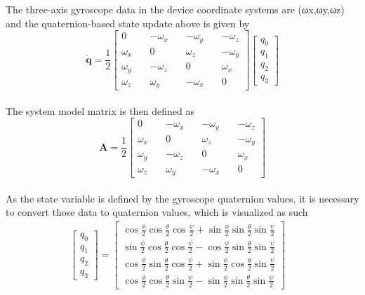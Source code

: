 \documentclass{l4proj}
\begin{document}
The three-axis gyroscope data in the device coordinate systems are (ωx,ωy,ωz) and the quaternion-based state update above is given by
\begin{equation*} \dot {\boldsymbol {q}} = \frac {1}{2}\left [{ {\begin{array}{*{20}{c}} 0&\quad { - {\omega _{x}}}&\quad { - {\omega _{y}}}&\quad { - {\omega _{z}}}\\ {\omega _{x}}&\quad 0&\quad {\omega _{z}}&\quad { - {\omega _{y}}}\\ {\omega _{y}}&\quad { - {\omega _{z}}}&\quad 0&\quad {\omega _{x}}\\ {\omega _{z}}&\quad {\omega _{y}}&\quad { - {\omega _{x}}}&\quad 0 \end{array}} }\right]\left [{ \begin{array}{l} {q_{0}}\\ {q_{1}}\\ {q_{2}}\\ {q_{3}} \end{array} }\right]\tag{10}\end{equation*}\\
The system model matrix is then defined as
\begin{equation*} \boldsymbol {A} = \frac {1}{2}\left [{ {\begin{array}{*{20}{c}} 0&\quad { - {\omega _{x}}}&\quad { - {\omega _{y}}}&\quad { - {\omega _{z}}}\\ {\omega _{x}}&\quad 0&\quad {\omega _{z}}&\quad { - {\omega _{y}}}\\ {\omega _{y}}&\quad { - {\omega _{z}}}&\quad 0&\quad {\omega _{x}}\\ {\omega _{z}}&\quad {\omega _{y}}&\quad { - {\omega _{x}}}&\quad 0 \end{array}} }\right]\tag{11}\end{equation*}\\
As the state variable is defined by the gyroscope quaternion values, it is necessary to convert those data to quaternion values, which is visualized as such
\begin{align*} \left [{ \begin{array}{l} {q_{0}}\\ {q_{1}}\\ {q_{2}}\\ {q_{3}} \end{array} }\right] = \left [{ \begin{array}{*{20}{c}} {\cos \frac {\phi }{2}\cos \frac {\theta }{2}\cos \frac {\psi }{2} + \sin \frac {\phi }{2}\sin \frac {\theta }{2}\sin \frac {\psi }{2}}\\[0.4pc] {\sin \frac {\phi }{2}\cos \frac {\theta }{2}\cos \frac {\psi }{2} - \cos \frac {\phi }{2}\sin \frac {\theta }{2}\sin \frac {\psi }{2}}\\[0.4pc] {\cos \frac {\phi }{2}\sin \frac {\theta }{2}\cos \frac {\psi }{2} + \sin \frac {\phi }{2}\cos \frac {\theta }{2}\sin \frac {\psi }{2}}\\[0.4pc] {\cos \frac {\phi }{2}\cos \frac {\theta }{2}\sin \frac {\psi }{2} - \sin \frac {\phi }{2}\sin \frac {\theta }{2}\sin \frac {\psi }{2}} \end{array}}\right]\quad \tag{12}\end{align*}
\end{document}
